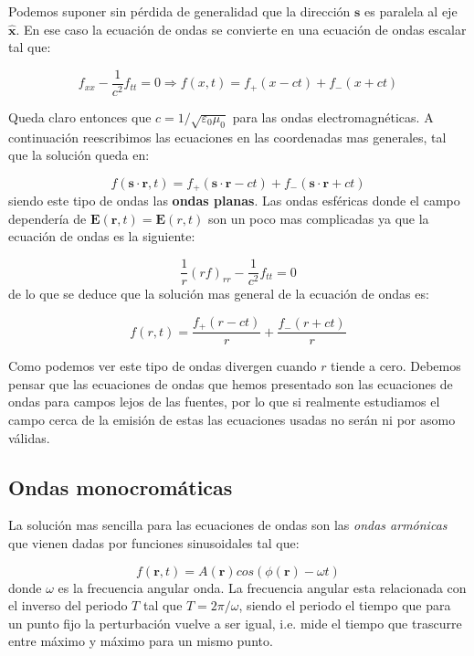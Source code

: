 \documentclass[12pt]{article}
\newcommand{\En}{\mathbf{E}}
\newcommand{\rn}{\mathbf{r}}
\newcommand{\sn}{\mathbf{s}}
\newcommand{\hnx}{\hat{\mathbf{x}}}
\numberwithin{equation}{section}
\numberwithin{figure}{section}
\begin{document}
Podemos suponer sin pérdida de generalidad que la dirección $\sn$ es paralela al eje $\hnx$.  En ese caso la ecuación de ondas se convierte en una ecuación de ondas escalar tal que:

\begin{equation}
f_{xx} - \dfrac{1}{c^2} f_{tt} = 0 \Longrightarrow f(x,t) = f_+ (x-ct) + f_- (x+ct)
\end{equation}

Queda claro entonces que $c= 1/\sqrt{\varepsilon
_0 \mu_0}$ para las ondas electromagnéticas. A continuación reescribimos las ecuaciones en las coordenadas mas generales, tal que la solución queda en:

\begin{equation}
f(\sn \cdot \rn,t) = f_+ (\sn \cdot \rn-ct) + f_- (\sn \cdot \rn +ct)
\end{equation}
siendo este tipo de ondas las \textbf{ondas planas}. Las ondas esféricas donde el campo dependería de $\En (\rn,t) = \En (r,t)$ son un poco mas complicadas ya que la ecuación de ondas es la siguiente:

\begin{equation}
\dfrac{1}{r} (rf)_{rr} - \frac{1}{c^2} f_{tt} = 0  
\end{equation}
de lo que se deduce que la solución mas general de la ecuación de ondas es:

\begin{equation}
f(r,t) = \dfrac{f_+ (r-ct)}{r} + \dfrac{f_- (r+ct)}{r}
\end{equation}

Como podemos ver este tipo de ondas divergen cuando $r$ tiende a cero. Debemos pensar que las ecuaciones de ondas que hemos presentado son las ecuaciones de ondas para campos lejos de las fuentes, por lo que si realmente estudiamos el campo cerca de la emisión de estas las ecuaciones usadas no serán ni por asomo válidas. \\

\subsection{Ondas monocromáticas}

La solución mas sencilla para las ecuaciones de ondas son las \textit{ondas armónicas} que vienen dadas por funciones sinusoidales tal que:

\begin{equation}
f(\rn,t) =  A(\rn) cos ( \phi(\rn) - \omega t) 
\end{equation}
donde $\omega$ es la frecuencia angular onda. La frecuencia angular esta relacionada con el inverso del periodo $T$ tal que $T = 2 \pi / \omega$, siendo el periodo el tiempo que para un punto fijo la perturbación vuelve a ser igual, i.e. mide el tiempo que trascurre entre máximo y máximo para un mismo punto. \\
\end{document}
